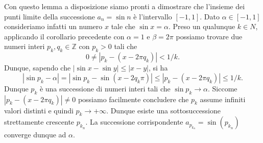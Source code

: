 \documentclass[italian,a4paper]{article}
\newcommand{\Z}{\mathbb{Z}}
\begin{document}
Con questo lemma a disposizione siamo pronti a dimostrare che
l'insieme dei punti limite della successione $a_n=\sin n$ \`e
l'intervallo $[-1,1]$. 
Dato $\alpha\in[-1,1]$ 
consideriamo infatti un numero $x$ tale che
$\sin x=\alpha$. Preso un qualunque $k\in N$, 
applicando il corollario precedente con $\alpha=1$ e
$\beta=2\pi$ possiamo trovare due numeri interi $p_k,q_k\in\Z$ con $p_k>0$
tali che 
\[
  0\neq |p_k - (x-2\pi q_k)| < 1/k.
\]
Dunque, sapendo che $|\sin x-\sin y|\le|x-y|$, si ha  
\[
  |\sin p_k-\alpha| = |\sin p_k - \sin(x-2 q_k\pi)| 
\le |p_k-(x-2\pi q_k)|\le 1/k.
\]
Dunque $p_k$ \`e una successione di numeri interi tali che $\sin
p_k\to \alpha$. 
Siccome $|p_k - (x-2\pi q_k)|\neq 0$ possiamo facilmente concludere
che $p_k$ assume infiniti valori distinti e quindi
$p_k\to+\infty$. Dunque esiste una sottosuccessione strettamente
crescente $p_{k_n}$. La successione corrispondente $a_{p_{k_n}} =
\sin(p_{k_n})$ converge dunque ad $\alpha$.
\end{document}
